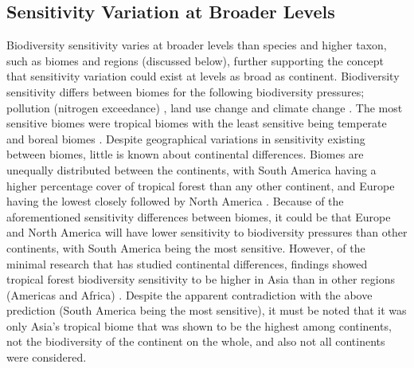\documentclass[11pt, a4paper, titlepage]{article}
\begin{document}
   	 \subsection*{Sensitivity Variation at Broader Levels}
   	 Biodiversity sensitivity varies at broader levels than species and higher taxon, such as biomes and regions (discussed below), further supporting the concept that sensitivity variation could exist at levels as broad as continent. Biodiversity sensitivity differs between biomes for the following biodiversity pressures; pollution (nitrogen exceedance) \citep{alkemade2009globio3}, land use change and climate change \citep{newbold2020tropical}. The most sensitive biomes were tropical biomes \citep{barlow2016anthropogenic} with the least sensitive being temperate and boreal biomes \citep{newbold2020tropical, cazalis2021mismatch, barlow2016anthropogenic}. Despite geographical variations in sensitivity existing between biomes, little is known about continental differences. Biomes are unequally distributed between the continents, with South America having a higher percentage cover of tropical forest than any other continent, and Europe having the lowest closely followed by North America \citep{wade2003distribution}.  Because of the aforementioned sensitivity differences between biomes, it could be that Europe and North America will have lower sensitivity to biodiversity pressures than other continents, with South America being the most sensitive. However, of the minimal research that has studied continental differences, findings showed tropical forest biodiversity sensitivity to be higher in Asia than in other regions (Americas and Africa) \citep{gibson2011primary}. Despite the apparent contradiction with the above prediction (South America being the most sensitive), it must be noted that it was only Asia's tropical biome that was shown to be the highest among continents, not the biodiversity of the continent on the whole, and also not all continents were considered. \newline
   	 
\end{document}
